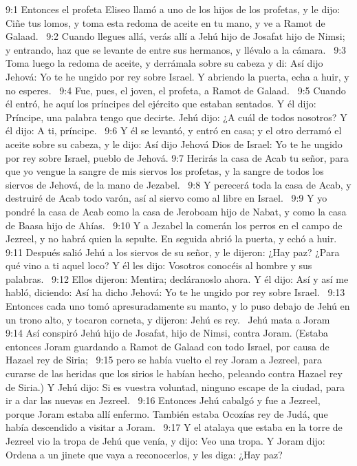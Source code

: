 9:1 Entonces el profeta Eliseo llamó a uno de los hijos de los profetas, y le dijo: Ciñe tus lomos, y toma esta redoma de aceite en tu mano, y ve a Ramot de Galaad.  
9:2 Cuando llegues allá, verás allí a Jehú hijo de Josafat hijo de Nimsi; y entrando, haz que se levante de entre sus hermanos, y llévalo a la cámara.  
9:3 Toma luego la redoma de aceite, y derrámala sobre su cabeza y di: Así dijo Jehová: Yo te he ungido por rey sobre Israel. Y abriendo la puerta, echa a huir, y no esperes.  
9:4 Fue, pues, el joven, el profeta, a Ramot de Galaad.  
9:5 Cuando él entró, he aquí los príncipes del ejército que estaban sentados. Y él dijo: Príncipe, una palabra tengo que decirte. Jehú dijo: ¿A cuál de todos nosotros? Y él dijo: A ti, príncipe.  
9:6 Y él se levantó, y entró en casa; y el otro derramó el aceite sobre su cabeza, y le dijo: Así dijo Jehová Dios de Israel: Yo te he ungido por rey sobre Israel, pueblo de Jehová. 
9:7 Herirás la casa de Acab tu señor, para que yo vengue la sangre de mis siervos los profetas, y la sangre de todos los siervos de Jehová, de la mano de Jezabel.  
9:8 Y perecerá toda la casa de Acab, y destruiré de Acab todo varón, así al siervo como al libre en Israel.  
9:9 Y yo pondré la casa de Acab como la casa de Jeroboam hijo de Nabat, y como la casa de Baasa hijo de Ahías.  
9:10 Y a Jezabel la comerán los perros en el campo de Jezreel, y no habrá quien la sepulte. En seguida abrió la puerta, y echó a huir.  
9:11 Después salió Jehú a los siervos de su señor, y le dijeron: ¿Hay paz? ¿Para qué vino a ti aquel loco? Y él les dijo: Vosotros conocéis al hombre y sus palabras.  
9:12 Ellos dijeron: Mentira; decláranoslo ahora. Y él dijo: Así y así me habló, diciendo: Así ha dicho Jehová: Yo te he ungido por rey sobre Israel.  
9:13 Entonces cada uno tomó apresuradamente su manto, y lo puso debajo de Jehú en un trono alto, y tocaron corneta, y dijeron: Jehú es rey.  
Jehú mata a Joram  
9:14 Así conspiró Jehú hijo de Josafat, hijo de Nimsi, contra Joram. (Estaba entonces Joram guardando a Ramot de Galaad con todo Israel, por causa de Hazael rey de Siria;  
9:15 pero se había vuelto el rey Joram a Jezreel, para curarse de las heridas que los sirios le habían hecho, peleando contra Hazael rey de Siria.) Y Jehú dijo: Si es vuestra voluntad, ninguno escape de la ciudad, para ir a dar las nuevas en Jezreel.  
9:16 Entonces Jehú cabalgó y fue a Jezreel, porque Joram estaba allí enfermo. También estaba Ocozías rey de Judá, que había descendido a visitar a Joram.  
9:17 Y el atalaya que estaba en la torre de Jezreel vio la tropa de Jehú que venía, y dijo: Veo una tropa. Y Joram dijo: Ordena a un jinete que vaya a reconocerlos, y les diga: ¿Hay paz?  
